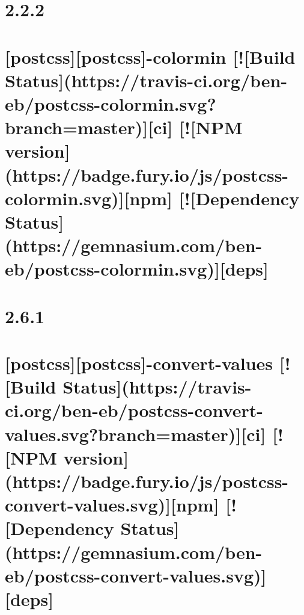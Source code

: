 \documentclass[twoside]{book}
\newcommand{\+}{\discretionary{\mbox{\scriptsize$\hookleftarrow$}}{}{}}
\begin{document}
\chapter{2.2.2}
\label{md__c_1_workspace_demo_src_main_script_node_modules_postcss-colormin__c_h_a_n_g_e_l_o_g}

\chapter{\mbox{[}postcss\mbox{]}\mbox{[}postcss\mbox{]}-\/colormin \mbox{[}!\mbox{[}Build Status\mbox{]}(https\+://travis-\/ci.org/ben-\/eb/postcss-\/colormin.svg?branch=master)\mbox{]}\mbox{[}ci\mbox{]} \mbox{[}!\mbox{[}N\+PM version\mbox{]}(https\+://badge.fury.\+io/js/postcss-\/colormin.svg)\mbox{]}\mbox{[}npm\mbox{]} \mbox{[}!\mbox{[}Dependency Status\mbox{]}(https\+://gemnasium.com/ben-\/eb/postcss-\/colormin.svg)\mbox{]}\mbox{[}deps\mbox{]}}
\label{md__c_1_workspace_demo_src_main_script_node_modules_postcss-colormin__r_e_a_d_m_e}

\chapter{2.6.1}
\label{md__c_1_workspace_demo_src_main_script_node_modules_postcss-convert-values__c_h_a_n_g_e_l_o_g}

\chapter{\mbox{[}postcss\mbox{]}\mbox{[}postcss\mbox{]}-\/convert-\/values \mbox{[}!\mbox{[}Build Status\mbox{]}(https\+://travis-\/ci.org/ben-\/eb/postcss-\/convert-\/values.svg?branch=master)\mbox{]}\mbox{[}ci\mbox{]} \mbox{[}!\mbox{[}N\+PM version\mbox{]}(https\+://badge.fury.\+io/js/postcss-\/convert-\/values.svg)\mbox{]}\mbox{[}npm\mbox{]} \mbox{[}!\mbox{[}Dependency Status\mbox{]}(https\+://gemnasium.com/ben-\/eb/postcss-\/convert-\/values.svg)\mbox{]}\mbox{[}deps\mbox{]}}
\label{md__c_1_workspace_demo_src_main_script_node_modules_postcss-convert-values__r_e_a_d_m_e}

\end{document}
